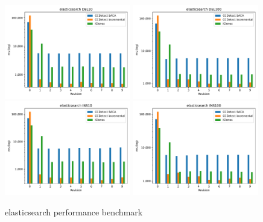 \begin{figure}[H]
    \begin{center}
        \includegraphics[width=0.49\textwidth]{figures/performancegraphs/elasticsearch_DEL10.pdf}
        \includegraphics[width=0.49\textwidth]{figures/performancegraphs/elasticsearch_DEL100.pdf}
        \includegraphics[width=0.49\textwidth]{figures/performancegraphs/elasticsearch_INS10.pdf} \includegraphics[width=0.49\textwidth]{figures/performancegraphs/elasticsearch_INS100.pdf} \end{center}
    \caption{elasticsearch performance benchmark}
    \label{fig:elasticsearch}
\end{figure}

